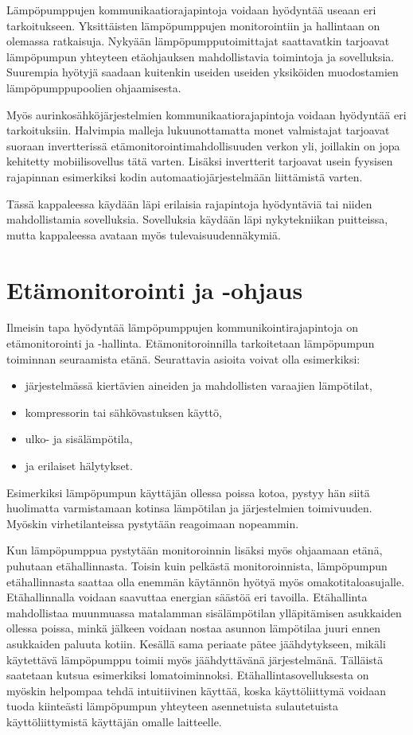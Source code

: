 Lämpöpumppujen kommunikaatiorajapintoja voidaan hyödyntää useaan eri tarkoitukseen. Yksittäisten lämpöpumppujen monitorointiin ja hallintaan on olemassa ratkaisuja. Nykyään lämpöpumpputoimittajat saattavatkin tarjoavat lämpöpumpun yhteyteen etäohjauksen mahdollistavia toimintoja ja sovelluksia. Suurempia hyötyjä saadaan kuitenkin useiden useiden yksiköiden muodostamien lämpöpumppupoolien ohjaamisesta. 

Myös aurinkosähköjärjestelmien kommunikaatiorajapintoja voidaan hyödyntää eri tarkoituksiin. Halvimpia malleja lukuunottamatta monet valmistajat tarjoavat suoraan invertterissä etämonitorointimahdollisuuden verkon yli, joillakin on jopa kehitetty mobiilisovellus tätä varten. Lisäksi invertterit tarjoavat usein fyysisen rajapinnan esimerkiksi kodin automaatiojärjestelmään liittämistä varten. 

Tässä kappaleessa käydään läpi erilaisia rajapintoja hyödyntäviä tai niiden mahdollistamia sovelluksia. Sovelluksia käydään läpi nykytekniikan puitteissa, mutta kappaleessa avataan myös tulevaisuudennäkymiä. 


\section{Etämonitorointi ja -ohjaus}

  Ilmeisin tapa hyödyntää lämpöpumppujen kommunikointirajapintoja on etämonitorointi ja -hallinta. Etämonitoroinnilla tarkoitetaan lämpöpumpun toiminnan seuraamista etänä. Seurattavia asioita voivat olla esimerkiksi:
  \begin{itemize}
    \item järjestelmässä kiertävien aineiden ja mahdollisten varaajien lämpötilat,
    \item kompressorin tai sähkövastuksen käyttö,
    \item ulko- ja sisälämpötila,
    \item ja erilaiset hälytykset.
  \end{itemize} \parencite{Latomaki}
  Esimerkiksi lämpöpumpun käyttäjän ollessa poissa kotoa, pystyy hän siitä huolimatta varmistamaan kotinsa lämpötilan ja järjestelmien toimivuuden. Myöskin virhetilanteissa pystytään reagoimaan nopeammin.

  Kun lämpöpumppua pystytään monitoroinnin lisäksi myös ohjaamaan etänä, puhutaan etähallinnasta. Toisin kuin pelkästä monitoroinnista, lämpöpumpun etähallinnasta saattaa olla enemmän käytännön hyötyä myös omakotitaloasujalle. Etähallinnalla voidaan saavuttaa energian säästöä eri tavoilla. Etähallinta mahdollistaa muunmuassa matalamman sisälämpötilan ylläpitämisen asukkaiden ollessa poissa, minkä jälkeen voidaan nostaa asunnon lämpötilaa juuri ennen asukkaiden paluuta kotiin. Kesällä sama periaate pätee jäähdytykseen, mikäli käytettävä lämpöpumppu toimii myös jäähdyttävänä järjestelmänä. Tälläistä saatetaan kutsua esimerkiksi lomatoiminnoksi. Etähallintasovelluksesta on myöskin helpompaa tehdä intuitiivinen käyttää, koska käyttöliittymä voidaan tuoda kiinteästi lämpöpumpun yhteyteen asennetuista sulautetuista käyttöliittymistä käyttäjän omalle laitteelle.


